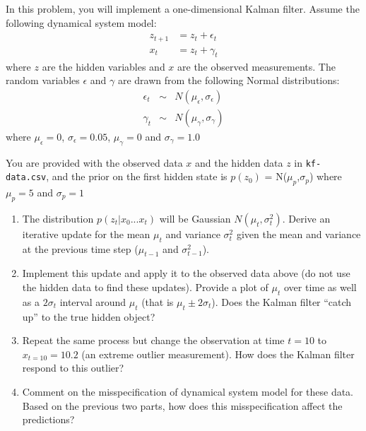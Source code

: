 \documentclass[submit]{harvardml}
\newcommand{\mueps}{\mu_{\epsilon}}
\newcommand{\sigeps}{\sigma_{\epsilon}}
\newcommand{\mugam}{\mu_{\gamma}}
\newcommand{\siggam}{\sigma_{\gamma}}
\newcommand{\muzp}{\mu_{p}}
\newcommand{\sigzp}{\sigma_{p}}
\begin{document}
\begin{problem}
In this problem, you will implement a one-dimensional Kalman filter.
Assume the following dynamical system model:
  \begin{eqnarray*}
    z_{t+1} &= z_{t} + \epsilon_{t} \\
    x_{t} & = z_{t} + \gamma_{t}
  \end{eqnarray*}
  where $z$ are the hidden variables and $x$ are the observed
  measurements.  The random variables $\epsilon$ and $\gamma$ are
  drawn from the following Normal distributions:
  \begin{eqnarray*}
    \epsilon_t &\sim& N(\mueps,\sigeps) \\
    \gamma_t &\sim& N(\mugam,\siggam)
  \end{eqnarray*}
  where $\mueps = 0$, $\sigeps=0.05$, $\mugam = 0$ and $\siggam=1.0$

You are provided with the observed data $x$ and the hidden data $z$ in
\texttt{kf-data.csv}, and the prior on the first hidden state is $p(z_0)$ =
N($\muzp$,$\sigzp$) where $\muzp = 5$ and $\sigzp=1$

    \begin{enumerate}
      \item The distribution $p(z_t|x_0...x_t)$ will be Gaussian
        $N(\mu_t,\sigma^2_t)$. Derive an iterative update for the mean
        $\mu_t$ and variance $\sigma^2_t$ given the mean and variance
        at the previous time step ($\mu_{t-1}$ and $\sigma^2_{t-1}$).

       \item Implement this update and apply it to the observed data
         above (do not use the hidden data to find these
         updates). Provide a plot of $\mu_t$ over time as well as a
         $2\sigma_t$ interval around $\mu_t$ (that is $\mu_t \pm
         2\sigma_t$).  Does the Kalman filter ``catch up'' to the true
         hidden object?

       \item Repeat the same process but change the observation at
         time $t=10$ to $x_{t=10}=10.2$ (an extreme outlier
         measurement).  How does the Kalman filter respond to this
         outlier?

       \item Comment on the misspecification of dynamical system model
         for these data.  Based on the previous two parts, how does
         this misspecification affect the predictions?

\end{enumerate}
\end{problem}
\end{document}
